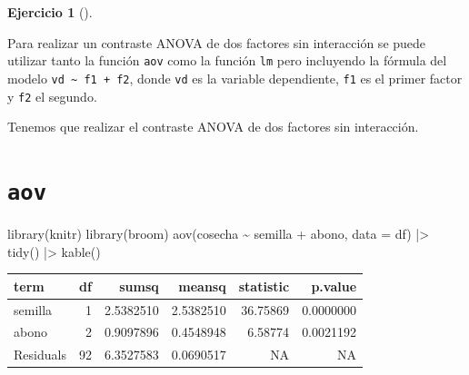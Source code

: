 \documentclass[
  a4paper,
]{scrreport}
\newenvironment{Shaded}{\begin{snugshade}}{\end{snugshade}}
\newcommand{\AttributeTok}[1]{\textcolor[rgb]{0.40,0.45,0.13}{#1}}
\newcommand{\FunctionTok}[1]{\textcolor[rgb]{0.28,0.35,0.67}{#1}}
\newcommand{\NormalTok}[1]{\textcolor[rgb]{0.00,0.23,0.31}{#1}}
\newcommand{\SpecialCharTok}[1]{\textcolor[rgb]{0.37,0.37,0.37}{#1}}
\theoremstyle{definition}
\newtheorem{exercise}{Ejercicio}[chapter]
\theoremstyle{remark}
\begin{document}
\begin{exercise}[]
\begin{enumerate}
\begin{tcolorbox}
  Para realizar un contraste ANOVA de dos factores sin interacción se
  puede utilizar tanto la función \texttt{aov} como la función
  \texttt{lm} pero incluyendo la fórmula del modelo
  \texttt{vd\ \textasciitilde{}\ f1\ +\ f2}, donde \texttt{vd} es la
  variable dependiente, \texttt{f1} es el primer factor y \texttt{f2} el
  segundo.

  \end{tcolorbox}

  \begin{tcolorbox}[enhanced jigsaw, colframe=quarto-callout-tip-color-frame, toprule=.15mm, bottomtitle=1mm, breakable, opacitybacktitle=0.6, toptitle=1mm, colback=white, bottomrule=.15mm, title=\textcolor{quarto-callout-tip-color}{\faLightbulb}\hspace{0.5em}{Solución}, arc=.35mm, left=2mm, titlerule=0mm, rightrule=.15mm, coltitle=black, leftrule=.75mm, opacityback=0, colbacktitle=quarto-callout-tip-color!10!white]

  Tenemos que realizar el contraste ANOVA de dos factores sin
  interacción.

  \section{\texorpdfstring{\texttt{aov}}{aov}}

\begin{Shaded}
\begin{Highlighting}[]
\FunctionTok{library}\NormalTok{(knitr)}
\FunctionTok{library}\NormalTok{(broom)}
\FunctionTok{aov}\NormalTok{(cosecha }\SpecialCharTok{\textasciitilde{}}\NormalTok{ semilla }\SpecialCharTok{+}\NormalTok{ abono, }\AttributeTok{data =}\NormalTok{ df) }\SpecialCharTok{|\textgreater{}} 
    \FunctionTok{tidy}\NormalTok{() }\SpecialCharTok{|\textgreater{}} 
    \FunctionTok{kable}\NormalTok{()}
\end{Highlighting}
\end{Shaded}

  \begin{longtable}[]{@{}lrrrrr@{}}
  \toprule\noalign{}
  term & df & sumsq & meansq & statistic & p.value \\
  \midrule\noalign{}
  \endhead
  \bottomrule\noalign{}
  \endlastfoot
  semilla & 1 & 2.5382510 & 2.5382510 & 36.75869 & 0.0000000 \\
  abono & 2 & 0.9097896 & 0.4548948 & 6.58774 & 0.0021192 \\
  Residuals & 92 & 6.3527583 & 0.0690517 & NA & NA \\
  \end{longtable}


\end{tcolorbox}
\end{enumerate}
\end{exercise}
\end{document}
